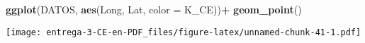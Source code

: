\documentclass[
]{article}
\newenvironment{Shaded}{\begin{snugshade}}{\end{snugshade}}
\newcommand{\DataTypeTok}[1]{\textcolor[rgb]{0.13,0.29,0.53}{#1}}
\newcommand{\DecValTok}[1]{\textcolor[rgb]{0.00,0.00,0.81}{#1}}
\newcommand{\KeywordTok}[1]{\textcolor[rgb]{0.13,0.29,0.53}{\textbf{#1}}}
\newcommand{\NormalTok}[1]{#1}
\newcommand{\OperatorTok}[1]{\textcolor[rgb]{0.81,0.36,0.00}{\textbf{#1}}}
\newcommand{\StringTok}[1]{\textcolor[rgb]{0.31,0.60,0.02}{#1}}
\begin{document}
\begin{Shaded}
\begin{Highlighting}[]
\KeywordTok{ggplot}\NormalTok{(DATOS, }\KeywordTok{aes}\NormalTok{(Long, Lat, }\DataTypeTok{color =}\NormalTok{ K_CE))}\OperatorTok{+}
\StringTok{  }\KeywordTok{geom_point}\NormalTok{()}
\end{Highlighting}
\end{Shaded}

\texttt{[image: entrega-3-CE-en-PDF\_files/figure-latex/unnamed-chunk-41-1.pdf]}

\begin{Shaded}
\end{Shaded}
\end{document}
